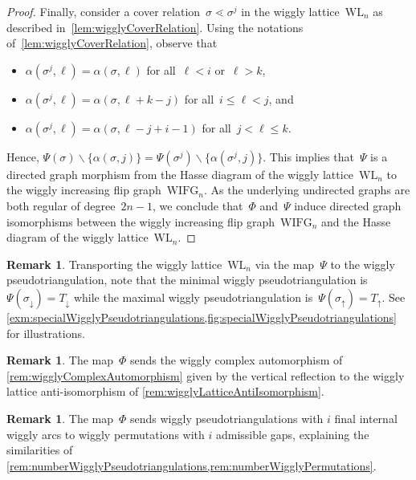 \documentclass{amsart}
\theoremstyle{definition}
\newtheorem{remark}[theorem]{Remark}
\newcommand{\ssm}{\smallsetminus} %
\newcommand{\wigglyIncreasingFlipGraph}{\mathrm{WIFG}} %
\newcommand{\wigglyLattice}{\mathrm{WL}} %
\begin{document}
\begin{proof}
Finally, consider a cover relation~$\sigma \lessdot \sigma^j$ in the wiggly lattice~$\wigglyLattice_n$ as described in~\cref{lem:wigglyCoverRelation}.
Using the notations of~\cref{lem:wigglyCoverRelation}, observe that
\begin{itemize}
\item $\alpha(\sigma^j, \ell) = \alpha(\sigma, \ell)$ for all~$\ell < i$ or~$\ell > k$,
\item $\alpha(\sigma^j, \ell) = \alpha(\sigma, \ell+k-j)$ for all~$i \le \ell < j$, and
\item $\alpha(\sigma^j, \ell) = \alpha(\sigma, \ell-j+i-1)$ for all~$j < \ell \le k$.
\end{itemize}
Hence, $\Psi(\sigma) \ssm \{\alpha(\sigma, j)\} = \Psi(\sigma^j) \ssm \{\alpha(\sigma^j, j)\}$.
This implies that~$\Psi$ is a directed graph morphism from the Hasse diagram of the wiggly lattice~$\wigglyLattice_n$ to the wiggly increasing flip graph~$\wigglyIncreasingFlipGraph_n$.
As the underlying undirected graphs are both regular of degree~$2n-1$, we conclude that~$\Phi$ and~$\Psi$ induce directed graph isomorphisms between the wiggly increasing flip graph~$\wigglyIncreasingFlipGraph_n$ and the Hasse diagram of the wiggly lattice~$\wigglyLattice_n$.
\end{proof}

\begin{remark}
Transporting the wiggly lattice~$\wigglyLattice_n$ via the map~$\Psi$ to the wiggly pseudotriangulation, note that the minimal wiggly pseudotriangulation is~$\Psi(\sigma_\downarrow) = T_\downarrow$ while the maximal wiggly pseudotriangulation is~$\Psi(\sigma_\uparrow) = T_\uparrow$. See \cref{exm:specialWigglyPseudotriangulations,fig:specialWigglyPseudotriangulations} for illustrations.
\end{remark}

\begin{remark}
The map~$\Phi$ sends the wiggly complex automorphism of \cref{rem:wigglyComplexAutomorphism} given by the vertical reflection to the wiggly lattice anti-isomorphism of \cref{rem:wigglyLatticeAntiIsomorphism}.
\end{remark}

\begin{remark}
The map~$\Phi$ sends wiggly pseudotriangulations with $i$ final internal wiggly arcs to wiggly permutations with $i$ admissible gaps, explaining the similarities of \cref{rem:numberWigglyPseudotriangulations,rem:numberWigglyPermutations}.
\end{remark}
\end{document}
